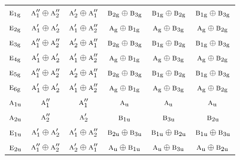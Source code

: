 \documentclass[10pt,a4paper]{article}
\numberwithin{equation}{section}
\newcommand{\irr}[1]{\text{\normalfont\scshape #1}}
\newcommand{\ptag}[1]{\mathrm{#1}}
\begin{document}
{\begin{longtable}{@{}lccccc@{}}
$\irr{e}_{1\ptag{g}}$ & $\irr{a}_{1}''\oplus \irr{a}_{2}''$ & $\irr{a}_{2}'\oplus \irr{a}_{1}''$ & $\irr{b}_{2\ptag{g}}\oplus \irr{b}_{3\ptag{g}}$ & $\irr{b}_{1\ptag{g}}\oplus \irr{b}_{2\ptag{g}}$ & $\irr{b}_{1\ptag{g}}\oplus \irr{b}_{3\ptag{g}}$\\
$\irr{e}_{2\ptag{g}}$ & $\irr{a}_{1}'\oplus \irr{a}_{2}'$ & $\irr{a}_{1}'\oplus \irr{a}_{2}''$ & $\irr{a}_{\ptag{g}}\oplus \irr{b}_{1\ptag{g}}$ & $\irr{a}_{\ptag{g}}\oplus \irr{b}_{3\ptag{g}}$ & $\irr{a}_{\ptag{g}}\oplus \irr{b}_{2\ptag{g}}$\\
$\irr{e}_{3\ptag{g}}$ & $\irr{a}_{1}''\oplus \irr{a}_{2}''$ & $\irr{a}_{2}'\oplus \irr{a}_{1}''$ & $\irr{b}_{2\ptag{g}}\oplus \irr{b}_{3\ptag{g}}$ & $\irr{b}_{1\ptag{g}}\oplus \irr{b}_{2\ptag{g}}$ & $\irr{b}_{1\ptag{g}}\oplus \irr{b}_{3\ptag{g}}$\\
$\irr{e}_{4\ptag{g}}$ & $\irr{a}_{1}'\oplus \irr{a}_{2}'$ & $\irr{a}_{1}'\oplus \irr{a}_{2}''$ & $\irr{a}_{\ptag{g}}\oplus \irr{b}_{1\ptag{g}}$ & $\irr{a}_{\ptag{g}}\oplus \irr{b}_{3\ptag{g}}$ & $\irr{a}_{\ptag{g}}\oplus \irr{b}_{2\ptag{g}}$\\
$\irr{e}_{5\ptag{g}}$ & $\irr{a}_{1}''\oplus \irr{a}_{2}''$ & $\irr{a}_{2}'\oplus \irr{a}_{1}''$ & $\irr{b}_{2\ptag{g}}\oplus \irr{b}_{3\ptag{g}}$ & $\irr{b}_{1\ptag{g}}\oplus \irr{b}_{2\ptag{g}}$ & $\irr{b}_{1\ptag{g}}\oplus \irr{b}_{3\ptag{g}}$\\
$\irr{e}_{6\ptag{g}}$ & $\irr{a}_{1}'\oplus \irr{a}_{2}'$ & $\irr{a}_{1}'\oplus \irr{a}_{2}''$ & $\irr{a}_{\ptag{g}}\oplus \irr{b}_{1\ptag{g}}$ & $\irr{a}_{\ptag{g}}\oplus \irr{b}_{3\ptag{g}}$ & $\irr{a}_{\ptag{g}}\oplus \irr{b}_{2\ptag{g}}$\\
$\irr{a}_{1\ptag{u}}$ & $\irr{a}_{1}''$ & $\irr{a}_{1}''$ & $\irr{a}_{\ptag{u}}$ & $\irr{a}_{\ptag{u}}$ & $\irr{a}_{\ptag{u}}$\\
$\irr{a}_{2\ptag{u}}$ & $\irr{a}_{2}''$ & $\irr{a}_{2}'$ & $\irr{b}_{1\ptag{u}}$ & $\irr{b}_{3\ptag{u}}$ & $\irr{b}_{2\ptag{u}}$\\
$\irr{e}_{1\ptag{u}}$ & $\irr{a}_{1}'\oplus \irr{a}_{2}'$ & $\irr{a}_{1}'\oplus \irr{a}_{2}''$ & $\irr{b}_{2\ptag{u}}\oplus \irr{b}_{3\ptag{u}}$ & $\irr{b}_{1\ptag{u}}\oplus \irr{b}_{2\ptag{u}}$ & $\irr{b}_{1\ptag{u}}\oplus \irr{b}_{3\ptag{u}}$\\
$\irr{e}_{2\ptag{u}}$ & $\irr{a}_{1}''\oplus \irr{a}_{2}''$ & $\irr{a}_{2}'\oplus \irr{a}_{1}''$ & $\irr{a}_{\ptag{u}}\oplus \irr{b}_{1\ptag{u}}$ & $\irr{a}_{\ptag{u}}\oplus \irr{b}_{3\ptag{u}}$ & $\irr{a}_{\ptag{u}}\oplus \irr{b}_{2\ptag{u}}$\\

\end{longtable}}
\end{document}
